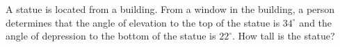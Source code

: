 \begin{exercise}
  A statue is located  from a building. From a window
  in the building, a person determines that the angle of elevation to
  the top of the statue is \(34^{\circ}\) and the angle of depression
  to the bottom of the statue is \(22^{\circ}\). How tall is the
  statue?

\end{exercise}



